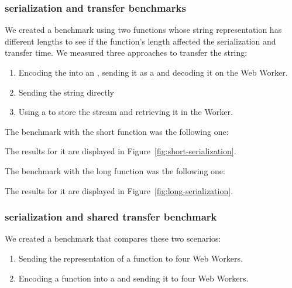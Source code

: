 \subsubsection{\tstring{} serialization and transfer benchmarks}
We created a benchmark using two functions whose string representation has different lengths to see if the function's length affected the serialization and transfer time. We measured three approaches to transfer the string:
\begin{enumerate}
  \item Encoding the \tstring{} into an \tabuffer{}, sending it as a  and decoding it on the Web Worker.
  \item Sending the string directly
  \item Using a  to store the stream and retrieving it in the Worker.
\end{enumerate}

The benchmark with the short function was the following one:

The results for it are displayed in Figure~\ref{fig:short-serialization}.

The benchmark with the long function was the following one:

The results for it are displayed in Figure~\ref{fig:long-serialization}.

\subsubsection{\tstring{} serialization and shared transfer benchmark}

We created a benchmark that compares these two scenarios:

\begin{enumerate}
\item Sending the \tstring{} representation of a function to four Web Workers.
\item Encoding a function into a \tsabuffer{} and sending it to four Web Workers.
\end{enumerate}

